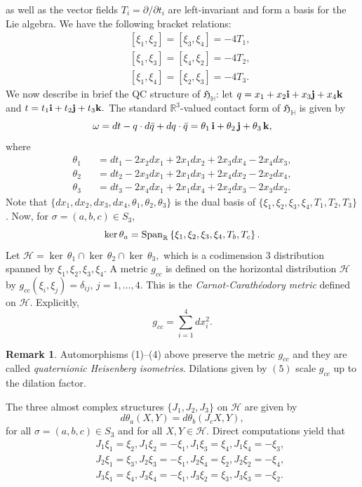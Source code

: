 \documentclass [12pt,a4paper]{amsart}
\newcommand{\calH}{\mathcal{H}}
\newcommand{\R}{\mathbb{R}}
\newcommand{\mH}{\mathbb{H}}
\newcommand{\frakH}{\mathfrak{H}}
\newcommand{\bi}{{\bf i}}
\newcommand{\bj}{{\bf j}}
\newcommand{\bk}{{\bf k}}
\theoremstyle{plain}
\theoremstyle{definition}
\newtheorem{rem}[thm]{Remark}
\numberwithin{equation}{section}
\begin{document}
as well as the vector fields $T_i=\partial/\partial t_i$ are left-invariant and form a basis for the Lie algebra.
We have the following bracket relations:
\begin{eqnarray*}
&&
[\xi_1,\xi_2]=[\xi_3,\xi_4]=-4T_1,\\
&&
[\xi_1,\xi_3]=[\xi_4,\xi_2]=-4T_2,\\
&&
[\xi_1,\xi_4]=[\xi_2,\xi_3]=-4T_3.
\end{eqnarray*}
We now describe in brief the QC structure of $\frakH_{\mH}$: let $q=x_1+x_2 \bi+x_3 \bj+x_4 \bk$ and $t=t_1\bi+t_2\bj+t_3\bk.$ The standard $\R^3$-valued contact form of $\frakH_{\mH}$ is given by
\begin{equation}
\omega=dt-q\cdot d\bar{q}+dq\cdot \bar{q}=\theta_1\,\bi+\theta_2\,\bj+\theta_3\,\bk,
\end{equation}
where
\begin{equation}\label{contactform}
\begin{aligned}
\theta_1&&=dt_1-2x_2dx_1+2x_1dx_2+2x_3dx_4-2x_4dx_3,\\
\theta_2&&=dt_2-2x_3dx_1+2x_1dx_3+2x_4dx_2-2x_2dx_4,\\
\theta_3&&=dt_3-2x_4dx_1+2x_1dx_4+2x_2dx_3-2x_3dx_2.
\end{aligned}
\end{equation}
Note that $\{dx_1, dx_2, dx_3,dx_4, \theta_1, \theta_2, \theta_3\}$ is the dual basis of $\{\xi_1,\xi_2,\xi_3,\xi_4,T_1,T_2,T_3\}$.
Now, for $\sigma=(a,b,c)\in S_3$,
$$\ker\theta_a={\rm Span}_{\R}\left\{\xi_1,\xi_2,\xi_3,\xi_4, T_b, T_c\right\}. 
$$
Let $\calH=\ker\, \theta_1\cap{\ker}\, \theta_2\cap{\ker}\, \theta_3,$ which is a codimension $3$ distribution spanned by $\xi_1, \xi_2, \xi_3, \xi_4.$ 
A metric $g_{cc}$ is defined on the horizontal distribution $\calH$ by
$g_{cc}(\xi_i, \xi_j)=\delta_{ij}$, $j=1,\dots, 4.$
This is the {\it Carnot-Carath\'eodory metric} defined on $\calH$. Explicitly, 
$$g_{cc}=\sum_{i=1}^4dx_i^2.$$
\begin{rem}
Automorphisms (1)--(4) above preserve the metric $g_{cc}$ and they are called {\it quaternionic Heisenberg isometries}. Dilations given by $(5)$ scale $g_{cc}$ up to the dilation factor. %
\end{rem}
The three almost complex structures
 $\{J_1, J_2, J_3\}$ on $\calH$ 
are given by 
$$d\theta_a(X, Y)=d\theta_b(J_c X,Y),$$
for all $\sigma=(a,b,c)\in S_3$ and for all $X, Y\in\calH.$ 
Direct computations yield that
\begin{eqnarray*}
&&J_1\xi_1=\xi_2, J_1\xi_2=-\xi_1,J_1\xi_3=\xi_4, J_1\xi_4=-\xi_3,\\
&&J_2\xi_1=\xi_3, J_2\xi_3=-\xi_1,J_2\xi_4=\xi_2, J_2\xi_2=-\xi_4,\\
&&J_3\xi_1=\xi_4, J_3\xi_4=-\xi_1,J_3\xi_2=\xi_3, J_3\xi_3=-\xi_2.
\end{eqnarray*}
\end{document}
